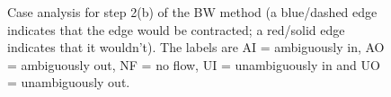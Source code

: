 \documentclass[preprint,a4paper]{elsarticle}
\newenvironment{stusubfig}[1]
{
	\begin{figure}[#1]
	\begin{center}
}
{
	\end{center}
	\end{figure}
}
\begin{document}
\begin{stusubfig}{p}
	\hspace{4mm}
\caption[Case analysis for step 2(b) of the BW method]{Case analysis for step 2(b) of the BW method (a blue/dashed edge indicates that the edge would be contracted; a red/solid edge indicates that it wouldn't). The labels are AI = ambiguously in, AO = ambiguously out, NF = no flow, UI = unambiguously in and UO = unambiguously out.}
\label{fig:segmentation-waterfall-smg-mergecases}
\end{stusubfig}
\end{document}
